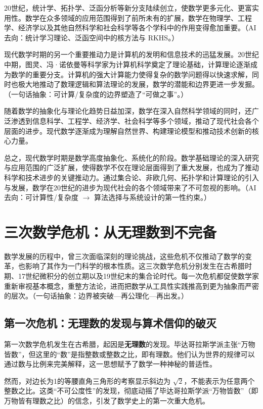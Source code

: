 20世纪，统计学、拓扑学、泛函分析等新分支陆续创立，使数学更多元化、更富实用性。数学在众多领域的应用范围得到了前所未有的扩展，数学在物理学、工程学、经济学以及其他自然科学和社会科学等各个学科中的作用变得愈加重要。{（AI 去向：统计学习理论、泛函空间中的核方法与 RKHS。）}

现代数学时期的另一个重要推动力是计算机的发明和信息技术的迅猛发展。20世纪中期，图灵、冯·诺依曼等科学家为计算机科学奠定了理论基础，计算理论逐渐成为数学的重要分支。计算机的强大计算能力使得复杂的数学问题得以快速求解，同时也极大地推动了数理逻辑和算法理论的发展，数学的潜能和边界更进一步发掘。{（一句话抽象：可计算/复杂度的边界塑造了“可做之事”。）}

随着数学的抽象化与理论化趋势日益加深，数学在深入自然科学领域的同时，还广泛渗透到信息科学、工程学、经济学、社会科学等多个领域，推动了现代社会各个层面的进步。现代数学逐渐成为理解自然世界、构建理论模型和推动技术创新的核心力量。

总之，现代数学时期是数学高度抽象化、系统化的阶段。数学基础理论的深入研究与应用范围的广泛扩展，使得数学不仅在理论层面得到了重大发展，也成为了推动科学和技术进步的关键推动力。通过集合论、非欧几何、拓扑学和计算理论的引入与发展，数学在20世纪的进步为现代社会的各个领域带来了不可忽视的影响。{（AI 去向：可计算性/复杂度 $\rightarrow$ 算法选择与系统设计的第一性约束。）}

\section{ 三次数学危机：从无理数到不完备}
数学发展的历程中，曾三次面临深刻的理论挑战，这些危机不仅推动了数学的变革，也影响了其作为一门科学的根本性质。这三次数学危机分别发生在古希腊时期、17世纪微积分的创立期以及19世纪末的集合论时代。每一次危机都促使数学家重新审视基本概念，重整方法论，进而把数学从工具性实践推高到更为抽象而严密的层次。{（一句话抽象：边界被突破—再公理化—再出发。）}

\subsection{第一次危机：无理数的发现与算术信仰的破灭}
第一次数学危机发生在古希腊，起因是{\bf 无理数}的发现。毕达哥拉斯学派主张“万物皆数”，但这里的“数”是指整数或整数之比，即有理数。他们认为世界的规律可以通过数与比例来完美解释，这一思想赋予了数学一种神秘的普适性。

然而，对边长为1的等腰直角三角形的考察显示斜边为 $\sqrt{2}$，不能表示为任意两个整数之比。这类“不可公度性”的发现，彻底动摇了毕达哥拉斯学派“万物皆数”（即万物皆有理数之比）的信念，引发了数学史上的第一次重大危机。

